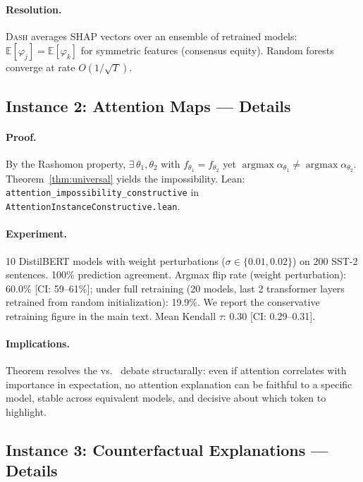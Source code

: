 \documentclass{article}
\newcommand{\E}{\mathbb{E}}
\newcommand{\DASH}{\textsc{Dash}}
\begin{document}
\paragraph{Resolution.}
\DASH{} averages SHAP vectors over an ensemble of retrained models: $\E[\varphi_j] = \E[\varphi_k]$ for symmetric features (consensus equity).  Random forests converge at rate $O(1/\sqrt{T})$.

\subsection{Instance 2: Attention Maps --- Details}

\paragraph{Proof.}
By the Rashomon property, $\exists\, \theta_1, \theta_2$ with $f_{\theta_1} = f_{\theta_2}$ yet $\operatorname{argmax} \alpha_{\theta_1} \neq \operatorname{argmax} \alpha_{\theta_2}$.  Theorem~\ref{thm:universal} yields the impossibility.  Lean: \texttt{attention\_impossibility\_constructive} in \texttt{AttentionInstanceConstructive.lean}.

\paragraph{Experiment.}
10 DistilBERT models with weight perturbations ($\sigma \in \{0.01, 0.02\}$) on 200 SST-2 sentences.  100\% prediction agreement.  Argmax flip rate (weight perturbation): 60.0\% [CI: 59--61\%]; under full retraining (20 models, last 2 transformer layers retrained from random initialization): 19.9\%.  We report the conservative retraining figure in the main text.  Mean Kendall $\tau$: 0.30 [CI: 0.29--0.31].

\paragraph{Implications.}
Theorem resolves the \citet{jainwallace2019} vs.\ \citet{wiegreffe2019attention} debate structurally: even if attention correlates with importance in expectation, no attention explanation can be faithful to a specific model, stable across equivalent models, and decisive about which token to highlight.

\subsection{Instance 3: Counterfactual Explanations --- Details}
\end{document}
